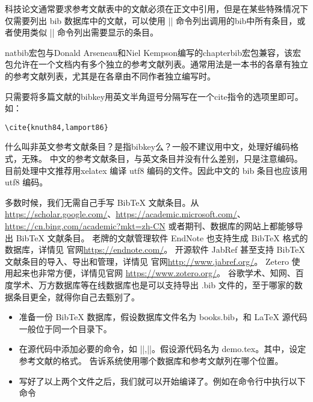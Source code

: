 科技论文通常要求参考文献表中的文献必须在正文中引用，但是在某些特殊情况下仅需要列出
bib 数据库中的文献，可以使用 |\nocite{*}|
命令列出调用的bib中所有条目，或者使用类似 |\nocite{ref1,ref2,ref3}| 命令列出需要显示的条目。







natbib宏包与Donald Arseneau和Niel
Kempson编写的chapterbib宏包兼容，该宏包允许在一个文档内有多个独立的参考文献列表。通常用法是一本书的各章有独立的参考文献列表，尤其是在各章由不同作者独立编写时。



只需要将多篇文献的bibkey用英文半角逗号分隔写在一个cite指令的选项里即可。如：

\begin{verbatim}
\cite{knuth84,lamport86}
\end{verbatim}



什么叫非英文参考文献条目？是指bibkey么？一般不建议用中文，处理好编码格式，无殊。
中文的参考文献条目，与英文条目并没有什么差别，只是注意编码。目前处理中文推荐用xelatex
编译 utf8 编码的文件。因此中文的 bib 条目也应该用 utf8 编码。



多数时候，我们无需自己手写 BibTeX 文献条目。从
\url{https://scholar.google.com/}、\url{https://academic.microsoft.com/}、
\url{https://cn.bing.com/academic?mkt=zh-CN}
或者期刊、数据库的网站上都能够导出 BibTeX 文献条目。 老牌的文献管理软件
EndNote 也支持生成 BibTeX 格式的数据库，详情见
官网\url{https://endnote.com/}。 开源软件 JabRef 甚至支持 BibTeX
文献条目的导入、导出和管理，详情见 官网\url{http://www.jabref.org/}。
Zetero 使用起来也非常方便，详情见官网 \url{https://www.zotero.org/}。
谷歌学术、知网、百度学术、万方数据库等在线数据库也是可以支持导出 .bib
文件的，至于哪家的数据条目更全，就得你自己去甄别了。



\begin{itemize}

\item
  准备一份 BibTeX 数据库，假设数据库文件名为 books.bib，和 LaTeX
  源代码一般位于同一个目录下。
\item
  在源代码中添加必要的命令，如 ||,||。假设源代码名为
   demo.tex。其中，设定参考文献的格式。
  告诉系统使用哪个数据库和参考文献列在哪个位置。
\item
  写好了以上两个文件之后，我们就可以开始编译了。例如在命令行中执行以下命令
\end{itemize}

